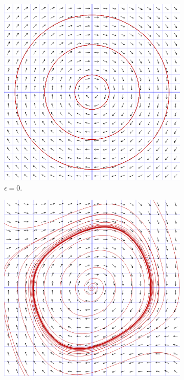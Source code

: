 \documentclass[11pt]{article}
\begin{document}
\begin{figure}[h]
        \centering
        \begin{subfigure}{0.24\textwidth}
        \centering
                \includegraphics[width=0.95\linewidth]{vdp_0.png}
                \caption{$\epsilon = 0$.}
        \end{subfigure}
        \begin{subfigure}{0.24\textwidth}
        \centering
                \includegraphics[width=0.95\linewidth]{vdp_0p25.png}

\end{subfigure}
\end{figure}
\end{document}
